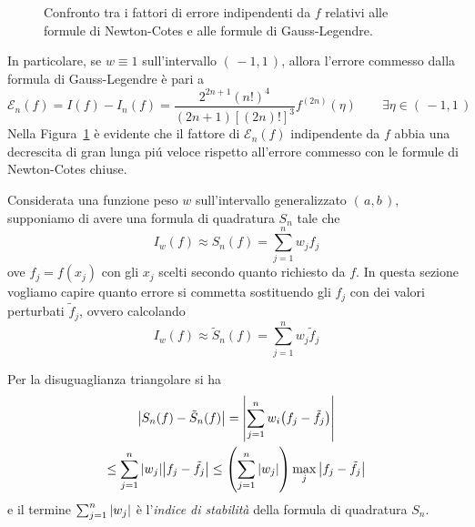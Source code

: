 	\begin{figure}[tpb]
		\centering
		
		
		\caption{Confronto tra i fattori di errore indipendenti da \(f\) relativi alle formule di Newton-Cotes e alle formule di Gauss-Legendre.}\label{fig:legendre-newton}
	\end{figure}

	In particolare, se \(w \equiv 1\) sull'intervallo \((\, -1, 1 \,)\), allora l'errore commesso dalla formula di Gauss-Legendre è pari a
	\begin{equation*}
		\mathcal{E}_n (f) = I (f) - I_n (f) = \frac{2^{2 n + 1} (n!)^4}{(2 n + 1) [(2 n)!]^3} f^{(2 n)} (\eta) \qquad \exists \eta \in (\, -1, 1 \,)
	\end{equation*}
	Nella Figura~\ref{fig:legendre-newton} è evidente che il fattore di \(\mathcal{E}_n (f)\) indipendente da \(f\) abbia una decrescita di gran lunga piú veloce rispetto all'errore commesso con le formule di Newton-Cotes chiuse.
	
	Considerata una funzione peso \(w\) sull'intervallo generalizzato \((\, a, b \,)\), supponiamo di avere una formula di quadratura \(S_n\) tale che
	\begin{equation*}
		I_w (f) \approx S_n (f) = \sum_{j = 1}^n w_j f_j
	\end{equation*}
	ove \(f_j = f (x_j)\) con gli \(x_j\) scelti secondo quanto richiesto da \(f\). In questa sezione vogliamo capire quanto errore si commetta sostituendo gli \(f_j\) con dei valori perturbati \(\tilde{f}_j\), ovvero calcolando
	\begin{equation*}
		I_w (f) \approx \tilde{S}_n (f) = \sum_{j = 1}^n w_j \tilde{f}_j
	\end{equation*}

	Per la disuguaglianza triangolare si ha
	\begin{multline*}
		\abs{S_n (f) - \tilde{S}_n (f)} = \abs{\sum_{j = 1}^n w_i \qty(f_j - \tilde{f}_j)} \\
		\le \sum_{j = 1}^n \abs{w_j} \abs{f_j - \tilde{f}_j} \le \qty(\sum_{j = 1}^n \abs{w_j}) \max_j \abs{f_j - \tilde{f}_j}
	\end{multline*}
	e il termine \(\sum_{j = 1}^n \abs{w_j}\) è l'\emph{indice di stabilità} della formula di quadratura \(S_n\).
	
